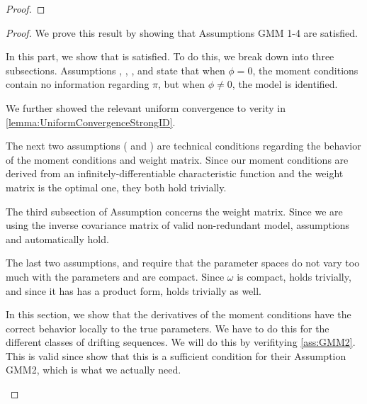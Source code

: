 \documentclass[11pt, letterpaper, twoside, final]{article}
\begin{document}
\begin{appendices}
\begin{proof}
\end{proof}


\InferenceWeakID*

\begin{proof}
We prove this result by showing that Assumptions GMM 1-4 are satisfied.

\begin{proofpart}
    \label{part:main_theorem_proof_part1}
    In this part, we show that  is satisfied. 
    To do this, we break   down into three subsections.
    Assumptions , , , and  state
    that when $\phi = 0$, the moment conditions contain no information regarding $\pi$, but when $\phi \neq 0$,
    the model is identified.
    

    We further showed the relevant uniform convergence to verity  in
    \cref{lemma:UniformConvergenceStrongID}.
    
    The next two assumptions ( and ) are  technical conditions regarding
    the behavior of the moment conditions and weight matrix. 
    Since our moment conditions are derived from an infinitely-differentiable  characteristic function and the
    weight matrix is the optimal one, they both hold trivially.
    
    The third subsection of Assumption  concerns the weight matrix.
    Since we are using the inverse covariance matrix of valid non-redundant model, assumptions
     and  automatically hold.
    
    The last two assumptions,  and  require that the parameter spaces do
    not vary too much with the parameters and are compact.
    Since $\omega$ is compact,  holds trivially, and since it has  has a product form,
      holds trivially as well.
    
\end{proofpart}


\begin{proofpart}
    \label{part:mainTheoremProofPart2}

    In this section, we show that the derivatives of the moment conditions have the correct behavior locally to
    the true parameters.
    We have to do this for the different classes of drifting sequences.
    We will do this by verifitying \cref{ass:GMM2}.
    This is valid since \textcite{andrews2014Gmm} show that this is a sufficient condition for their Assumption
    GMM2, which is what we actually need. 


\end{proofpart}
\end{proof}
\end{appendices}
\end{document}
